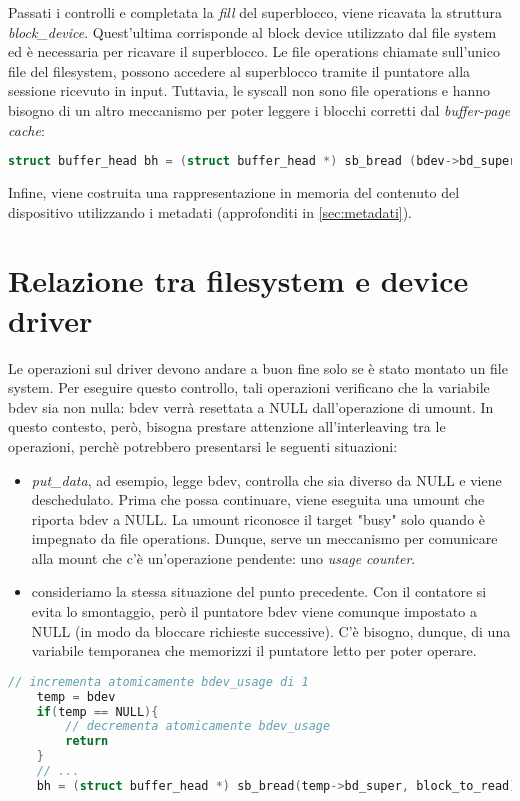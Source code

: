 \documentclass[a4paper,12pt,oneside]{book}
\begin{document}
Passati i controlli e completata la \emph{fill} del superblocco, viene ricavata la struttura \emph{block\_device}. Quest'ultima corrisponde al block device utilizzato dal file system ed è necessaria per ricavare il superblocco. Le file operations chiamate sull'unico file del filesystem, possono accedere al superblocco tramite il puntatore alla sessione ricevuto in input. Tuttavia, le syscall non sono file operations e hanno bisogno di un altro meccanismo per poter leggere i blocchi corretti dal \emph{buffer-page cache}:\\
\begin{lstlisting}[language=C]
	struct buffer_head bh = (struct buffer_head *) sb_bread (bdev->bd_super, block_to_read);  
\end{lstlisting}

\bigskip
Infine, viene costruita una rappresentazione in memoria del contenuto del dispositivo utilizzando i metadati (approfonditi in \ref{sec:metadati}).\\

	\section{Relazione tra filesystem e device driver}
	Le operazioni sul driver devono andare a buon fine solo se è stato montato un file system. Per eseguire questo controllo, tali operazioni verificano che la variabile bdev sia non nulla: bdev verrà resettata a NULL dall'operazione di umount. In questo contesto, però, bisogna prestare attenzione all'interleaving tra le operazioni, perchè potrebbero presentarsi le seguenti situazioni:
\begin{itemize}
		\item \emph{put\_data}, ad esempio, legge bdev, controlla che sia diverso da NULL e viene deschedulato. Prima che possa continuare, viene eseguita una umount che riporta bdev a NULL. La umount riconosce il  target "busy" solo quando è impegnato da file operations. Dunque, serve un meccanismo per comunicare alla mount che c'è un'operazione pendente: uno \emph{usage counter}.  
		\item consideriamo la stessa situazione del punto precedente. Con il contatore si evita lo smontaggio, però il puntatore bdev viene comunque impostato a NULL (in modo da bloccare richieste successive). C'è bisogno, dunque, di una variabile temporanea che memorizzi il puntatore letto per poter operare.
\end{itemize}

\begin{lstlisting}[language=C]
	// incrementa atomicamente bdev_usage di 1            
	temp = bdev
	if(temp == NULL){
		// decrementa atomicamente bdev_usage
		return
	}
	// ...
	bh = (struct buffer_head *) sb_bread(temp->bd_super, block_to_read);
\end{lstlisting}
\end{document}
